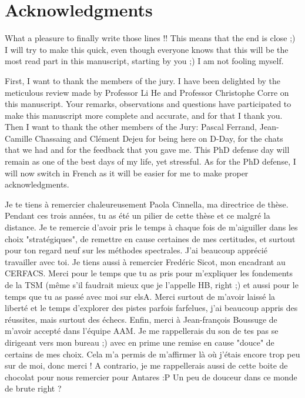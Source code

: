 
\chapter*{Acknowledgments}
\thispagestyle{empty}

What a pleasure to finally write those lines !! This means that
the end is close ;)
I will try to make this quick, even though everyone knows that this
will be the most read part in this manuscript, starting by you ;)
I am not fooling myself.

First, I want to thank the members of the jury. I have been
delighted by the meticulous review made by Professor Li He and Professor 
Christophe Corre on this manuscript. Your remarks, observations
and questions
have participated to make this manuscript more complete and accurate, and
for that I thank you.
Then I want to thank the other members of the Jury: Pascal Ferrand, 
Jean-Camille Chassaing and Clément Dejeu for being here on D-Day,
for the chats that we had
and for the feedback that you gave me. This PhD defense day will remain as one of the
best days of my life, yet stressful.
As for the PhD defense, I will now switch in French as it will
be easier for me to make proper acknowledgments.

Je te tiens à remercier chaleureusement Paola Cinnella, ma
directrice de thèse. Pendant ces trois années, tu as été un pilier
de cette thèse et ce malgré la distance. 
Je te remercie d'avoir pris le temps à chaque fois
de m'aiguiller dans les choix "stratégiques", de remettre en cause
certaines de mes certitudes, et surtout pour ton regard neuf sur les méthodes
spectrales. J'ai beaucoup apprécié travailler avec toi.
Je tiens aussi à remercier Fredéric Sicot, mon encadrant au CERFACS.
Merci pour le temps que tu as pris pour m'expliquer les fondements de 
la TSM (même s'il faudrait mieux que je l'appelle HB, right ;)
et aussi pour le temps que tu as passé avec moi sur elsA. 
Merci surtout de m'avoir laissé la liberté et le temps
d'explorer des pistes parfois farfelues, j'ai beaucoup appris 
des réussites, mais surtout des échecs. Enfin, merci à Jean-françois Boussuge
de m'avoir accepté dans l'équipe AAM.
Je me rappellerais du son
de tes pas se dirigeant vers mon bureau ;) avec
en prime une remise en cause "douce" de certains de mes choix.
Cela m'a permis de m'affirmer là où j'étais encore trop
peu sur de moi, donc merci ! A contrario, je me rappellerais aussi 
de cette boite de chocolat pour nous remercier pour Antares :P
Un peu de douceur dans ce monde de brute right ?

